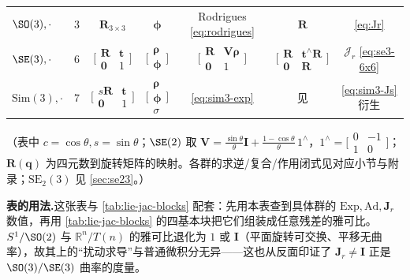 \begin{table}[H]
\begin{tabular}{lcccccc}
$\SO(3),\cdot$ & $3$ & $\mathbf{R}_{3\times3}$ & $\boldsymbol{\phi}$ & Rodrigues \cref{eq:rodrigues} & $\mathbf{R}$ & \cref{eq:Jr} \\
$\SE(3),\cdot$ & $6$ & $\big[\begin{smallmatrix}\mathbf{R}&\mathbf{t}\\\mathbf{0}&1\end{smallmatrix}\big]$ & $\big[\begin{smallmatrix}\boldsymbol{\rho}\\\boldsymbol{\phi}\end{smallmatrix}\big]$ & $\big[\begin{smallmatrix}\mathbf{R}&\mathbf{V}\boldsymbol{\rho}\\\mathbf{0}&1\end{smallmatrix}\big]$ & $\big[\begin{smallmatrix}\mathbf{R}&\mathbf{t}^\wedge\mathbf{R}\\\mathbf{0}&\mathbf{R}\end{smallmatrix}\big]$ & $\boldsymbol{\mathcal{J}}_r$ \cref{eq:se3-6x6} \\
$\mathrm{Sim}(3),\cdot$ & $7$ & $\big[\begin{smallmatrix}s\mathbf{R}&\mathbf{t}\\\mathbf{0}&1\end{smallmatrix}\big]$ & $\big[\begin{smallmatrix}\boldsymbol{\rho}\\\boldsymbol{\phi}\\\sigma\end{smallmatrix}\big]$ & \cref{eq:sim3-exp} & 见\cite{eade2017lie} & \cref{eq:sim3-Js} 衍生 \\
\bottomrule
\end{tabular}
\end{table}

\noindent（表中 $c=\cos\theta,s=\sin\theta$；$\SE(2)$ 取 $\mathbf{V}=\tfrac{\sin\theta}{\theta}\mathbf{I}+\tfrac{1-\cos\theta}{\theta}\,1^\wedge$，$1^\wedge=\big[\begin{smallmatrix}0&-1\\1&0\end{smallmatrix}\big]$；$\mathbf{R}(\mathbf{q})$ 为四元数到旋转矩阵的映射。各群的求逆/复合/作用闭式见对应小节与附录；$\mathrm{SE}_2(3)$ 见 \cref{sec:se23}。）

\begin{note}
\textbf{表的用法.}\;这张表与 \cref{tab:lie-jac-blocks} 配套：先用本表查到具体群的 $\mathrm{Exp},\mathrm{Ad},\mathbf{J}_r$ 数值，再用 \cref{tab:lie-jac-blocks} 的四基本块把它们组装成任意残差的雅可比。$S^1/\SO(2)$ 与 $\mathbb{R}^n/T(n)$ 的雅可比退化为 $1$ 或 $\mathbf{I}$（平面旋转可交换、平移无曲率），故其上的“扰动求导”与普通微积分无异——这也从反面印证了 $\mathbf{J}_r\neq\mathbf{I}$ 正是 $\SO(3)/\SE(3)$ 曲率的度量。
\end{note}

